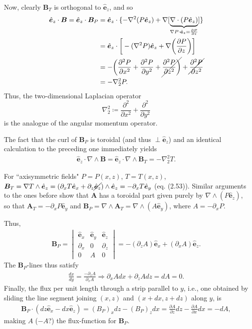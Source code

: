 \documentclass[12pt]{article} %
\newcommand{\pderiv}[2]{\frac{\partial#1}{\partial#2}}
\newcommand{\ppderiv}[2]{\frac{\partial^2#1}{\partial#2^2}}
\newcommand{\e}{\hat{\bm{e}}}
\begin{document}
Now, clearly $\bm{B}_T$ is orthogonal to $\e_z$, and so
\begin{align*}
\e_z\cdot\bm{B} = \e_z\cdot\bm{B}_P &= \e_z\cdot\{-\nabla^2(P\e_z) + \nabla[\underbrace{\nabla\cdot(P\e_z)}_{\nabla P\cdot\e_z = \pderiv{P}{z}}]\}\\
&= \e_z\cdot\bigg{[} -(\nabla^2P)\e_z + \nabla\bigg{(}\pderiv{P}{z}\bigg{)}\bigg{]}\\
&=  -\bigg{(}\ppderiv{P}{x} + \ppderiv{P}{y} + \cancel{ \ppderiv{P}{z}\bigg{)}}+ \cancel{\ppderiv{P}{z}}\\
&= -\nabla_2^2P.
\end{align*}
Thus, the two-dimensional Laplacian operator $$\nabla_2^2\coloneqq \ppderiv{}{x} + \ppderiv{}{y}$$ is the analogue of the angular momentum operator. 

The fact that the curl of $\bm{B}_P$ is toroidal (and thus $\perp\e_z$) and an identical calculation to the preceding one immediately yields
\begin{align*}
\e_z\cdot \nabla\wedge\bm{B} = \e_z\cdot\nabla\wedge\bm{B}_T = -\nabla_2^2T.
\end{align*}

For ``axisymmetric fields" $P=P(x,z)$, $T=T(x,z)$, $\bm{B}_T = \nabla T\wedge \e_z = (\partial_xT\e_x + \partial_z\cancel{\e_z})\wedge\e_z = -\partial_xT\e_y$ (eq. (2.53)). Similar arguments to the ones before show that $\bm{A}$ has a toroidal part given purely by $\nabla\wedge(P\e_z)$, so that $\bm{A}_T = -\partial_xP\e_y$ and $\bm{B}_P = \nabla \wedge\bm{A}_T=\nabla\wedge(A\e_y)$, where $A=-\partial_xP$.

Thus, 
\begin{align*}
\bm{B}_P = \begin{vmatrix}\e_x & \e_y & \e_z\\
\partial_x & 0 & \partial_z\\
0 & A & 0\end{vmatrix}
= -(\partial_zA)\e_x + (\partial_xA)\e_z. 
\end{align*}
The $\bm{B}_P$-lines thus satisfy 
\begin{align*}
\frac{dx}{dy} = \frac{-\partial_zA}{\partial_xA}\Longrightarrow \partial_xAdx + \partial_zAdz = dA = 0.
\end{align*}
Finally, the flux per unit length through a strip parallel to $y$, i.e., one obtained by sliding the line segment joining $(x,z)$ and $(x+dx,z+dz)$ along $y$, is
\begin{align*}
\bm{B}_P\cdot(dz\e_x - dx\e_z) = (B_P)_xdz - (B_P)_zdx = \pderiv{A}{z}dz - \pderiv{A}{x}dx = -dA,
\end{align*}
making $A$ ($-A$?) the flux-function for $\bm{B}_P$. 
\end{document}
